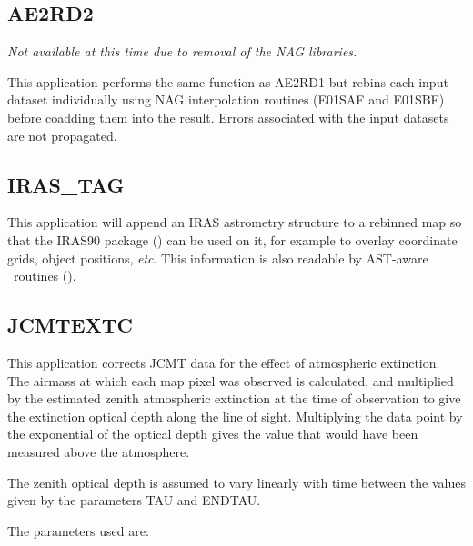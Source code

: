\documentclass[twoside,11pt,nolof]{starlink}
\providecommand{\Kappa}{\xref{{\sc{Kappa}}}{sun95}{}}
\begin{document}
\goodbreak

\subsection{AE2RD2}

\textit{Not available at this time due to removal of the NAG libraries.}

This application performs the same function as AE2RD1 but rebins each
input dataset individually using NAG interpolation routines (E01SAF
and E01SBF) before coadding them into the result. Errors associated
with the input datasets are not propagated.


\goodbreak

\subsection{IRAS\_TAG}

This application will append an IRAS astrometry structure to a
rebinned map so that the IRAS90 package
() can be used on it,
for example to overlay coordinate grids, object positions, \emph{etc}.
This information is also readable by AST-aware \Kappa\ routines ().

\goodbreak

\subsection{JCMTEXTC}

This application corrects JCMT data for the effect of  atmospheric
extinction. The airmass at which each map pixel was  observed is
calculated, and multiplied by the estimated zenith  atmospheric
extinction at the time of observation to give the  extinction optical
depth along the line of sight. Multiplying the data point by the
exponential of the optical depth gives  the value that would have been
measured above the atmosphere.

The zenith optical depth is assumed to vary linearly with  time
between the values given by the parameters TAU and ENDTAU.

\goodbreak

The parameters used are:
\end{document}
